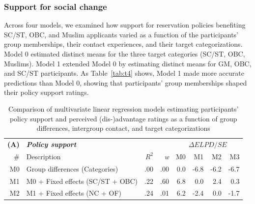 \documentclass[12pt, a4paper]{article}
\begin{document}
\subsubsection{Support for social change}

Across four models, we examined how support for reservation policies benefiting SC/ST, OBC, and Muslim applicants varied as a function of the participants’ group memberships, their contact experiences, and their target categorizations. Model 0 estimated distinct means for the three target categories (SC/ST, OBC, Muslims). Model 1 extended Model 0 by estimating distinct means for GM, OBC, and SC/ST participants. As Table~\ref{tab:t4} shows, Model 1 made more accurate predictions than Model 0, showing that participants’ group memberships shaped their policy support ratings. 

\begin{table}
\caption{Comparison of multivariate linear regression models estimating participants’ policy support and perceived (dis-)advantage ratings as a function of group differences, intergroup contact, and target categorizations}
\centering
{}
\small
\begin{tabularx}{\linewidth}{rXrrrrrr} \toprule
\textbf{(A)} & \textit{\textbf{Policy support}}            & \multicolumn{1}{l}{} & \multicolumn{1}{l}{} & \multicolumn{4}{c}{$\Delta\textit{ELPD}/\textit{SE}$}                                                                                \\ \cmidrule{5-8}
\#           & Description                                 & $R^2$          & \textit{w}           & M0                         & M1                          & M2                          & M3                          \\ \midrule
M0           & Group differences (Categories)              & .00                  & .00                  & {\color[HTML]{E0E0E0} 0.0} & {\color[HTML]{B2182B} -6.8} & {\color[HTML]{B2182B} -6.2} & {\color[HTML]{B2182B} -6.7} \\
M1           & M0 + Fixed effects (SC/ST + OBC)            & .22                  & .60                  & {\color[HTML]{2166AC} 6.8} & {\color[HTML]{E0E0E0} 0.0}  & {\color[HTML]{F4A582} 2.4}  & {\color[HTML]{E0E0E0} 0.3}  \\
M2           & M1 + Fixed effects (NC + OF)                & .24                  & .01                  & {\color[HTML]{2166AC} 6.2} & {\color[HTML]{92C5DE} -2.4} & {\color[HTML]{E0E0E0} 0.0}  & {\color[HTML]{FDDBC7} -1.7} \\

\end{tabularx}
\end{table}
\end{document}
